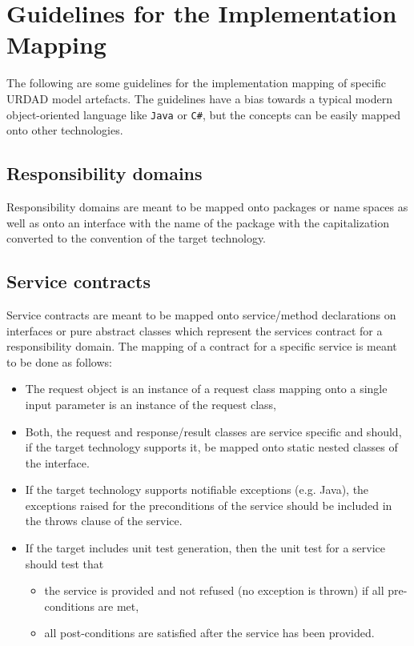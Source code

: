 \section{Guidelines for the Implementation Mapping}

The following are some guidelines for the implementation mapping of specific URDAD model artefacts. The guidelines have a bias towards a typical modern object-oriented language like \verb+Java+ or \verb+C#+, but the concepts can be easily mapped onto other technologies.

\subsection{Responsibility domains}

Responsibility domains are meant to be mapped onto packages or name spaces as well as onto an interface with the name of the package with the capitalization converted to the convention of the target technology. 

\subsection{Service contracts}

Service contracts are meant to be mapped onto service/method declarations on interfaces or pure abstract classes which represent the services contract for a responsibility domain. The mapping of a contract for a specific service is meant to be done as follows:
\begin{itemize}
  \item The request object is an instance of a request class mapping onto a single input parameter is an instance of the request class,
  \item Both, the request and response/result classes are service specific and should, if the target technology supports it, be mapped onto static nested classes of the interface.
  \item If the target technology supports notifiable exceptions (e.g. Java), the exceptions raised for the preconditions of the service should be included in the throws clause of the service.
  \item If the target includes unit test generation, then the unit test for a service should test that
    \begin{itemize}
      \item the service is provided and not refused (no exception is thrown) if all pre-conditions are met,
      \item all post-conditions are satisfied after the service has been provided.
    \end{itemize}
\end{itemize}

